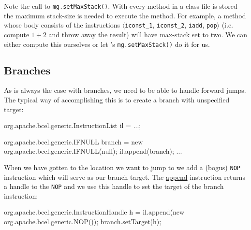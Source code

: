 Note the call to {\tt mg.setMaxStack()}. With every method in a
class file is stored the maximum stack-size is needed to execute
the method. For example, a method whose body consists of the
instructions $\langle${\tt iconst\_1}, {\tt iconst\_2}, {\tt iadd},
{\tt pop}$\rangle$ (i.e. compute $1+2$ and throw away the result)
will have max-stack set to two. We can either compute this ourselves
or let \BCEL's {\tt mg.setMaxStack()} do it for us.

\subsection{Branches}
As is always the case with branches, we need to be able
to handle forward jumps. The typical way of accomplishing
this is to create a branch with unspecified target:
\begin{listing}{1}
   org.apache.bcel.generic.InstructionList il = ...;
 
   org.apache.bcel.generic.IFNULL branch = 
      new org.apache.bcel.generic.IFNULL(null);
   il.append(branch);
   ...
\end{listing}
When we have gotten to the location we want to
jump to we add a (bogus) {\tt NOP} instruction
which will serve as our branch target.
The \url{append} instruction returns a handle
to the {\tt NOP} and we use this handle to
set the target of the branch instruction:
\begin{listingcont}
   org.apache.bcel.generic.InstructionHandle h = 
      il.append(new org.apache.bcel.generic.NOP());
   branch.setTarget(h);
\end{listingcont}

